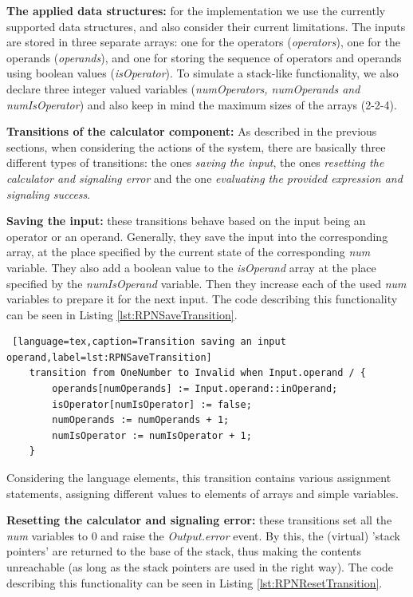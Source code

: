 \textbf{The applied data structures:} for the implementation we use the currently supported data structures, and also consider their current limitations. The inputs are stored in three separate arrays: one for the operators (\textit{operators}), one for the operands (\textit{operands}), and one for storing the sequence of operators and operands using boolean values (\textit{isOperator}). To simulate a stack-like functionality, we also declare three integer valued variables (\textit{numOperators, numOperands and numIsOperator}) and also keep in mind the maximum sizes of the arrays (2-2-4).   

\bigskip
\textbf{Transitions of the calculator component:}
As described in the previous sections, when considering the actions of the system, there are basically three different types of transitions: the ones \textit{saving the input}, the ones \textit{resetting the calculator and signaling error} and the one \textit{evaluating the provided expression and signaling success}. 

\textbf{Saving the input:} these transitions behave based on the input being an operator or an operand. Generally, they save the input into the corresponding array, at the place specified by the current state of the corresponding \textit{num} variable. They also add a boolean value to the \textit{isOperand} array at the place specified by the \textit{numIsOperand} variable. Then they increase each of the used \textit{num} variables to prepare it for the next input. The code describing this functionality can be seen in Listing \ref{lst:RPNSaveTransition}.

\bigskip
\begin{lstlisting} [language=tex,caption=Transition saving an input operand,label=lst:RPNSaveTransition]
	transition from OneNumber to Invalid when Input.operand / {
		operands[numOperands] := Input.operand::inOperand;
		isOperator[numIsOperator] := false;
		numOperands := numOperands + 1;
		numIsOperator := numIsOperator + 1;
	}
\end{lstlisting}

Considering the language elements, this transition contains various assignment statements, assigning different values to elements of arrays and simple variables.

\textbf{Resetting the calculator and signaling error:} these transitions set all the \textit{num} variables to 0 and raise the \textit{Output.error} event. By this, the (virtual) 'stack pointers' are returned to the base of the stack, thus making the contents unreachable (as long as the stack pointers are used in the right way). The code describing this functionality can be seen in Listing \ref{lst:RPNResetTransition}.

